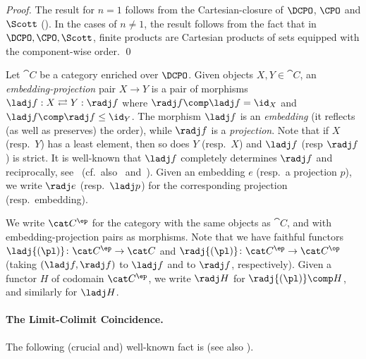 \begin{proof}
The result for $n=1$ follows from the
Cartesian-closure of $\DCPO$, $\CPO$ and $\Scott$
(\cite[Theorem 3.3.3, Theorem 3.3.5 and Corollary 4.1.6]{aj95chapter}).
In the cases of $n \neq 1$, the result follows from the fact that
in $\DCPO, \CPO, \Scott$, finite products are Cartesian products
of sets equipped with the component-wise order.
\qed
\end{proof}

Let $\cat C$ be a category enriched over $\DCPO$.
Given objects $X,Y \in \cat C$,
an \emph{embedding-projection} pair $X \to Y$
is a pair of morphisms $\ladj f: X\rightleftarrows Y:\radj f$
where $\radj f \comp \ladj f = \id_X$ and $\ladj f \comp \radj f \leq \id_Y$.
The morphism $\ladj f$ is an \emph{embedding}
(it reflects (as well as preserves) the order),
while $\radj f$ is a \emph{projection}.
Note that if $X$ (resp.\ $Y$) has a least element,
then so does $Y$ (resp.\ $X$) and $\ladj f$ (resp $\radj f$)
is strict.
It is well-known that $\ladj f$ completely determines $\radj f$
and reciprocally, see~\cite[\S 7.1]{ac98book}
(cf.\ also~\cite[\S 3.1.4]{aj95chapter} and~\cite[\S 9]{streicher06book}).
Given an embedding $e$ (resp.\ a projection $p$),
we write $\radj e$ (resp.\ $\ladj p$)
for the corresponding projection (resp.\ embedding).

We write $\cat C^\ep$ for the category with the same objects as $\cat C$,
and with embedding-projection pairs as morphisms.
Note that we have faithful functors
$\ladj{(\pl)} \colon \cat C^\ep \to \cat C$
and
$\radj{(\pl)} \colon \cat C^\ep \to \cat C^\op$
(taking $(\ladj f,\radj f)$ to $\ladj f$ and to $\radj f$,
respectively).
Given a functor $H$ of codomain $\cat C^\ep$,
we write $\radj H$ for $\radj{(\pl)} \comp H$,
and similarly for $\ladj H$.


\paragraph{The Limit-Colimit Coincidence.}
The following (crucial and) well-known fact
is \cite[Theorem 7.1.10]{ac98book}
(see also \cite[Theorem 3.3.7]{aj95chapter}).

